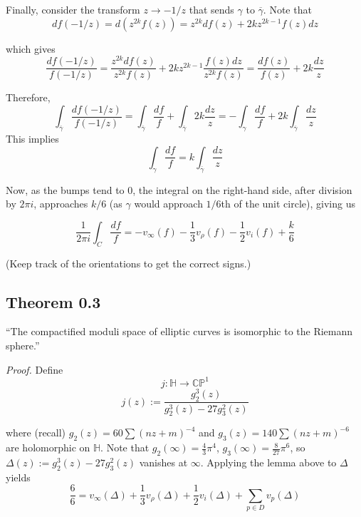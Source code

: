 \documentclass[11pt,a4paper]{article}
\begin{document}
Finally, consider the transform $z\rightarrow -1/z$ that sends $\gamma$ to $\overline{\gamma}$. Note that
$$df(-1/z) = d(z^{2k}f(z)) = z^{2k}df(z) + 2kz^{2k-1}f(z)dz$$

which gives
$$\frac{df(-1/z)}{f(-1/z)} = \frac{z^{2k}df(z)}{z^{2k}f(z)} + 2kz^{2k-1}\frac{f(z)dz}{z^{2k}f(z)} = \frac{df(z)}{f(z)} + 2k\frac{dz}{z}$$

Therefore,
$$\int_{\overline{\gamma}}\frac{df(-1/z)}{f(-1/z)} = \int_{\overline{\gamma}}\frac{df}{f} + \int_{\overline{\gamma}}2k\frac{dz}{z} = -\int_{\gamma}\frac{df}{f} + 2k\int_{\overline{\gamma}}\frac{dz}{z}$$
This implies
$$\int_{\gamma} \frac{df}{f} = k\int_{\overline{\gamma}}\frac{dz}{z}$$

Now, as the bumps tend to $0$, the integral on the right-hand side, after division by $2\pi i$, approaches $k/6$ (as $\gamma$ would approach $1/6$th of the unit circle), giving us

$$\frac{1}{2\pi i}\int_{C}\frac{df}{f} = -v_{\infty}(f) - \frac{1}{3}v_{\rho}(f) - \frac{1}{2}v_{i}(f) + \frac{k}{6}$$

(Keep track of the orientations to get the correct signs.)


\subsection*{Theorem 0.3}
    ``The compactified moduli space of elliptic curves is isomorphic to the Riemann sphere.''


\textit{Proof.}
    Define
    $$j:\mathbb{H} \rightarrow \mathbb{CP}^1$$
    $$j(z) := \frac{g_2^3(z)}{g_2^3(z) - 27g_3^2(z)}$$

where (recall) $g_2(z) = 60\sum(nz+m)^{-4}$ and $g_3(z) = 140\sum(nz+m)^{-6}$ are holomorphic on $\mathbb{H}$. Note that $g_2(\infty) = \frac{4}{3}\pi^4$, $g_3(\infty) = \frac{8}{27}\pi^6$, so $\Delta(z):= g_2^3(z) - 27g_3^2(z)$ vanishes at $\infty$. Applying the lemma above to $\Delta$ yields
$$\frac{6}{6} = v_{\infty}(\Delta) +\frac{1}{3}v_{\rho}(\Delta) + \frac{1}{2}v_{i}(\Delta) + \sum_{p\in D} v_p(\Delta)$$
\end{document}
